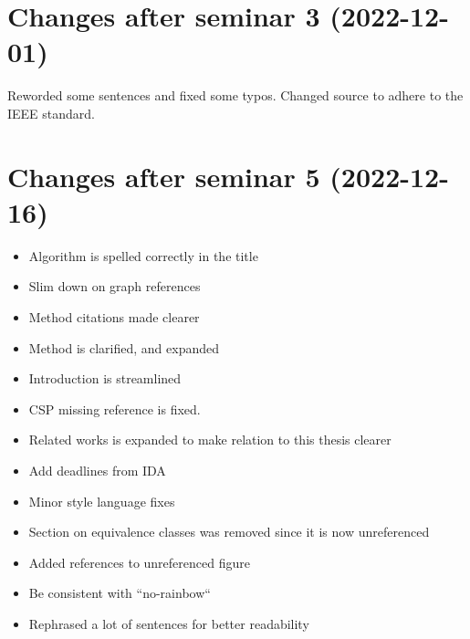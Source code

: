 \documentclass[msc,lith,english]{liuthesis}
\begin{document}
\chapter{Changes after seminar 3 (2022-12-01)}
Reworded some sentences and fixed some typos. Changed source to adhere to the IEEE standard.

\chapter{Changes after seminar 5 (2022-12-16)}

\begin{itemize}
  \item Algorithm is spelled correctly in the title
  \item Slim down on graph references
  \item Method citations made clearer
  \item Method is clarified, and expanded
  \item Introduction is streamlined
  \item CSP missing reference is fixed. 
  \item Related works is expanded to make relation to this thesis clearer
  \item Add deadlines from IDA
  \item Minor style language fixes
  \item Section on equivalence classes was removed since it is now unreferenced
  \item Added references to unreferenced figure
  \item Be consistent with ``no-rainbow``
  \item Rephrased a lot of sentences for better readability
\end{itemize}
\end{document}
